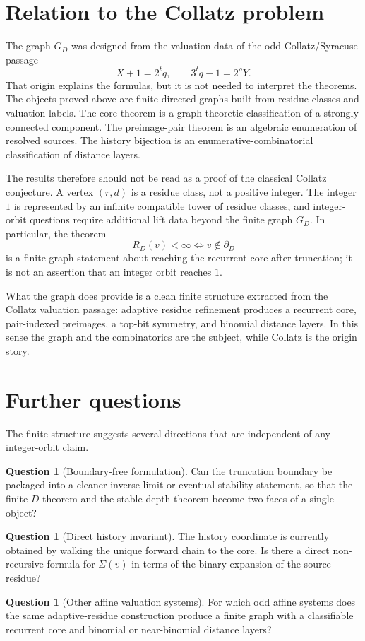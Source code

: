 \documentclass[11pt]{article}
\theoremstyle{definition}
\newtheorem{question}[theorem]{Question}
\theoremstyle{remark}
\newcommand{\bdD}{\partial_D}
\begin{document}
\section{Relation to the Collatz problem}\label{sec:collatz}

The graph $G_D$ was designed from the valuation data of the odd Collatz/Syracuse passage
\[
X+1=2^tq,
\qquad
3^tq-1=2^\rho Y.
\]
That origin explains the formulas, but it is not needed to interpret the theorems.  The objects proved above are finite directed graphs built from residue classes and valuation labels.  The core theorem is a graph-theoretic classification of a strongly connected component.  The preimage-pair theorem is an algebraic enumeration of resolved sources.  The history bijection is an enumerative-combinatorial classification of distance layers.

The results therefore should not be read as a proof of the classical Collatz conjecture.  A vertex $(r,d)$ is a residue class, not a positive integer.  The integer $1$ is represented by an infinite compatible tower of residue classes, and integer-orbit questions require additional lift data beyond the finite graph $G_D$.  In particular, the theorem
\[
R_D(v)<\infty\Longleftrightarrow v\notin\bdD
\]
is a finite graph statement about reaching the recurrent core after truncation; it is not an assertion that an integer orbit reaches $1$.

What the graph does provide is a clean finite structure extracted from the Collatz valuation passage: adaptive residue refinement produces a recurrent core, pair-indexed preimages, a top-bit symmetry, and binomial distance layers.  In this sense the graph and the combinatorics are the subject, while Collatz is the origin story.

\section{Further questions}

The finite structure suggests several directions that are independent of any integer-orbit claim.

\begin{question}[Boundary-free formulation]
Can the truncation boundary be packaged into a cleaner inverse-limit or eventual-stability statement, so that the finite-$D$ theorem and the stable-depth theorem become two faces of a single object?
\end{question}

\begin{question}[Direct history invariant]
The history coordinate is currently obtained by walking the unique forward chain to the core.  Is there a direct non-recursive formula for $\Sigma(v)$ in terms of the binary expansion of the source residue?
\end{question}

\begin{question}[Other affine valuation systems]
For which odd affine systems does the same adaptive-residue construction produce a finite graph with a classifiable recurrent core and binomial or near-binomial distance layers?
\end{question}
\end{document}
